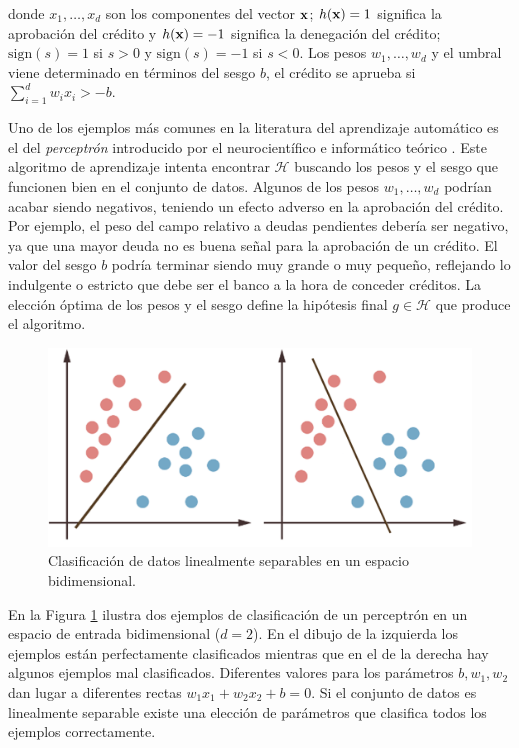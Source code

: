 \documentclass[oneside,openright,titlepage,numbers=noenddot,openany,headinclude,footinclude=true,
cleardoublepage=empty,abstractoff,BCOR=5mm,paper=a4,fontsize=12pt,main=spanish]{scrreprt}
\begin{document}
donde $x_1,\dots,x_d$ son los componentes del vector $\textbf{x}$; $h(\textbf{x})=1$ significa la aprobación del crédito y $h(\textbf{x})=-1$ significa la denegación del crédito; $\text{sign}(s)=1$ si $s>0$ y $\text{sign}(s)=-1$ si $s<0$. Los pesos $w_1,\dots,w_d$ y el umbral viene determinado en términos del sesgo $b$, el crédito se aprueba si $\displaystyle \sum_{i=1}^d w_ix_i > -b.$ 

Uno de los ejemplos más comunes en la literatura del aprendizaje automático es el del \textit{perceptrón} introducido por el neurocientífico e informático teórico \cite{perceptron1957}. Este algoritmo de aprendizaje intenta encontrar $\mathcal{H}$ buscando los pesos y el sesgo que funcionen bien en el conjunto de datos. Algunos de los pesos $w_1,\dots,w_d$ podrían acabar siendo negativos, teniendo un efecto adverso en la aprobación del crédito. Por ejemplo, el peso del campo relativo a deudas pendientes debería ser negativo, ya que una mayor deuda no es buena señal para la aprobación de un crédito. El valor del sesgo $b$ podría terminar siendo muy grande o muy pequeño, reflejando lo indulgente o estricto que debe ser el banco a la hora de conceder créditos. La elección óptima de los pesos y el sesgo define la hipótesis final $g \in \mathcal{H}$ que produce el algoritmo.\\

\begin{figure}[h]
	\centering
	\includegraphics[width=12.4cm]{gbclassified.png}
	\caption{Clasificación de datos linealmente separables en un espacio bidimensional.}
    \label{fig:linsep}
\end{figure}

En la Figura \ref{fig:linsep} ilustra dos ejemplos de clasificación de un perceptrón en un espacio de entrada bidimensional ($d=2$). En el dibujo de la izquierda los ejemplos están perfectamente clasificados mientras que en el de la derecha hay algunos ejemplos mal clasificados. Diferentes valores para los parámetros $b,w_1,w_2$ dan lugar a diferentes rectas $w_1x_1+w_2x_2+b=0$. Si el conjunto de datos es linealmente separable existe una elección de parámetros que clasifica todos los ejemplos correctamente.
\end{document}

